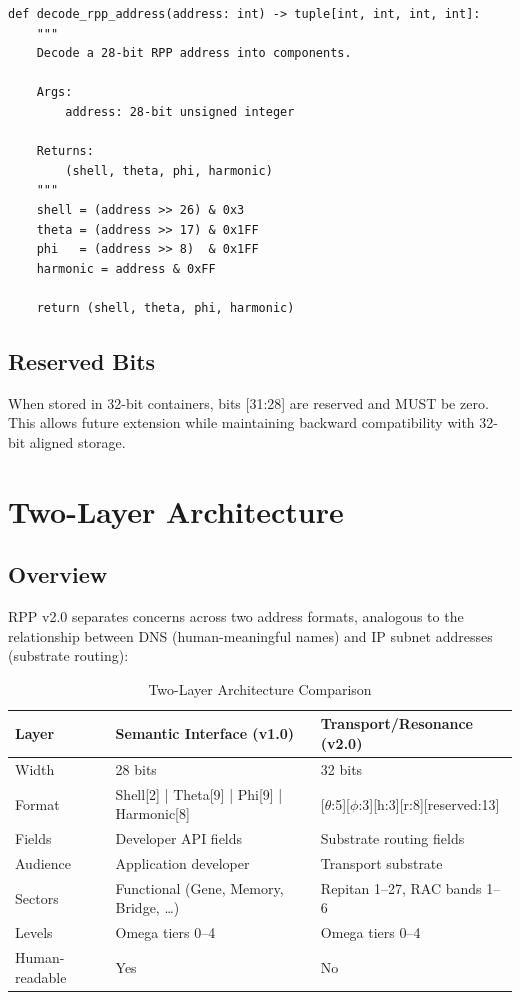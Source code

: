 \documentclass[11pt,a4paper]{article}
\begin{document}
\begin{lstlisting}[style=python,caption={RPP Address Decoding}]
def decode_rpp_address(address: int) -> tuple[int, int, int, int]:
    """
    Decode a 28-bit RPP address into components.

    Args:
        address: 28-bit unsigned integer

    Returns:
        (shell, theta, phi, harmonic)
    """
    shell = (address >> 26) & 0x3
    theta = (address >> 17) & 0x1FF
    phi   = (address >> 8)  & 0x1FF
    harmonic = address & 0xFF

    return (shell, theta, phi, harmonic)
\end{lstlisting}

\subsection{Reserved Bits}

When stored in 32-bit containers, bits [31:28] are reserved and MUST be zero. This allows future extension while maintaining backward compatibility with 32-bit aligned storage.

\section{Two-Layer Architecture}

\subsection{Overview}

RPP v2.0 separates concerns across two address formats, analogous to the relationship between DNS (human-meaningful names) and IP subnet addresses (substrate routing):

\begin{table}[h]
\centering
\begin{tabular}{lll}
\toprule
\textbf{Layer} & \textbf{Semantic Interface (v1.0)} & \textbf{Transport/Resonance (v2.0)} \\
\midrule
Width & 28 bits & 32 bits \\
Format & Shell[2] | Theta[9] | Phi[9] | Harmonic[8] & {[}\ensuremath{\theta}:5]{[}\ensuremath{\phi}:3]{[}h:3]{[}r:8]{[}reserved:13] \\
Fields & Developer API fields & Substrate routing fields \\
Audience & Application developer & Transport substrate \\
Sectors & Functional (Gene, Memory, Bridge, \ldots) & Repitan 1--27, RAC bands 1--6 \\
Levels & Omega tiers 0--4 & Omega tiers 0--4 \\
Human-readable & Yes & No \\
\bottomrule
\end{tabular}
\caption{Two-Layer Architecture Comparison}
\label{tab:two-layer}
\end{table}
\end{document}
